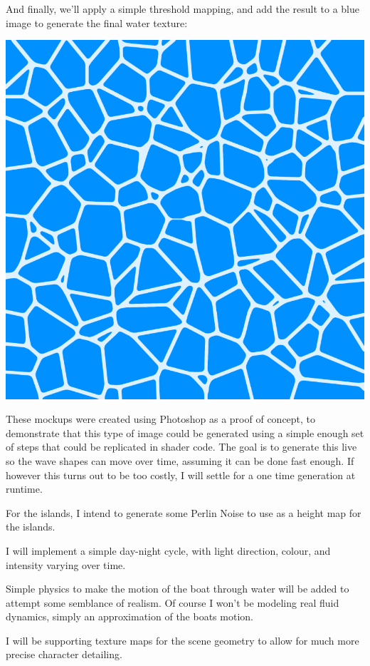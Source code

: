 \documentclass {article}
\begin{document}
\begin{description}
And finally, we'll apply a simple threshold mapping, and add the result to a blue image to generate the final water texture:

\includegraphics[scale=0.2]{texture}

\pagebreak

These mockups were created using Photoshop as a proof of concept, to demonstrate that this type of image could be generated using a simple enough set of steps that could be replicated in shader code.  The goal is to generate this live so the wave shapes can move over time, assuming it can be done fast enough.  If however this turns out to be too costly, I will settle for a one time generation at runtime.

For the islands, I intend to generate some Perlin Noise to use as a height map for the islands.

I will implement a simple day-night cycle, with light direction, colour, and intensity varying over time.

Simple physics to make the motion of the boat through water will be added to attempt some semblance of realism.  Of course I won't be modeling real fluid dynamics, simply an approximation of the boats motion.

I will be supporting texture maps for the scene geometry to allow for much more precise character detailing.


\end{description}
\end{document}
